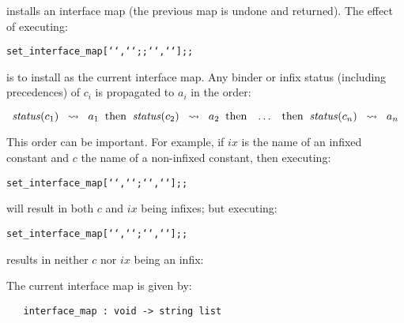 {{\noindent installs an interface map (the previous map is undone and returned). 
The effect of executing:

\begin{hol}\begin{alltt}
   set_interface_map [``,``; \m{\ldots} ;``,``];;
\end{alltt}\end{hol}

\noindent is to install 
\ml{[`\m{a_1}`,`\m{c_1}`;\m{\ \ldots\ } ;`\m{a_n}`,`\m{c_n}`]}
as the current interface map.  Any
binder or infix status (including precedences) of $c_i$ is propagated 
to $a_i$ in the order:


\[ {\it status\/}(c_1)\;\;\leadsto\;\; a_1\;\; {\rm then}\;\;
   {\it status\/}(c_2)\;\;\leadsto\;\; a_2\;\; {\rm then}\;\;\;
    \ldots\;\;\;{\rm then}\;\; {\it status\/}(c_n)\;\;\leadsto\;\;a_n \]



\noindent This order can be important. For example, if $ix$ is the 
name of an
infixed constant and $c$ the name of a non-infixed 
constant, then executing:

{\def\con#1{\mbox{\normalsize\sf #1}}
\begin{hol}\begin{alltt}
   set\_interface\_map[``,``; ``,``];;
\end{alltt}\end{hol}}


\noindent will result in both $c$ and $ix$ being infixes; but 
executing:

{\def\con#1{\mbox{\normalsize\sf #1}}
\begin{hol}\begin{alltt}
   set\_interface\_map[``,``; ``,``];;
\end{alltt}\end{hol}}


\noindent results in neither $c$ nor $ix$ being an infix:

The current interface map is given by:


\begin{boxed}
\begin{verbatim}
   interface_map : void -> string list
\end{verbatim}\end{boxed}

}}
